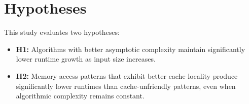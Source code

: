 \section{Hypotheses}

This study evaluates two hypotheses:

\begin{itemize}
\item \textbf{H1:} Algorithms with better asymptotic complexity maintain significantly lower runtime growth as input size increases.
\item \textbf{H2:} Memory access patterns that exhibit better cache locality produce significantly lower runtimes than cache-unfriendly patterns, even when algorithmic complexity remains constant.
\end{itemize}
